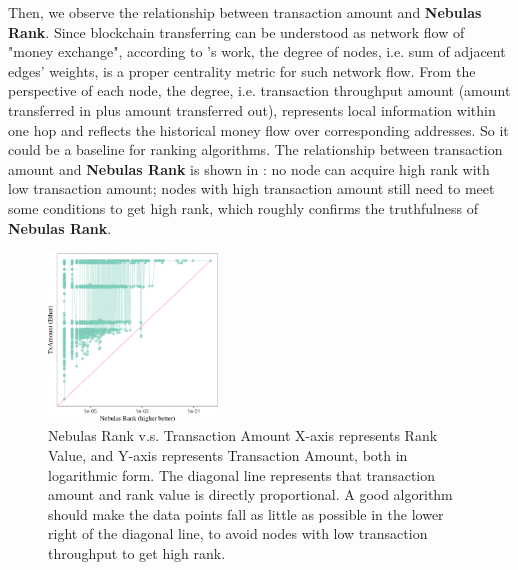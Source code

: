 Then, we observe the relationship between transaction amount and \textbf{Nebulas Rank}. Since blockchain transferring can be understood as network flow of "money exchange", according to \textcite{Borgatti2005}'s work, the degree of nodes, i.e. sum of adjacent edges' weights, is a proper centrality metric for such network flow. From the perspective of each node, the degree, i.e. transaction throughput amount (amount transferred in plus amount transferred out), represents local information within one hop and reflects the historical money flow over corresponding addresses. So it could be a baseline for ranking algorithms. The relationship between transaction amount and \textbf{Nebulas Rank} is shown in : no node can acquire high rank with low transaction amount; nodes with high transaction amount still need to meet some conditions to get high rank, which roughly confirms the truthfulness of \textbf{Nebulas Rank}.
\begin{figure}[!htbp]
	\centering
	\includegraphics[width=0.40\textwidth]{figs/MAY_lr.png}
	\caption{Nebulas Rank v.s. Transaction Amount \small{X-axis represents Rank Value, and Y-axis represents Transaction Amount, both in logarithmic form.  The diagonal line represents that transaction amount and rank value is directly proportional. A good algorithm should make the data points fall as little as possible in the lower right of the diagonal line, to avoid nodes with low transaction throughput to get high rank.}}\label{fig:nrio}
\end{figure}

